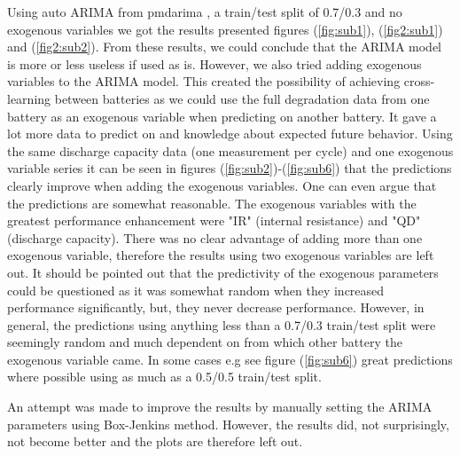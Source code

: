 \documentclass{article}
\begin{document}
Using auto ARIMA from pmdarima \cite{pmdarima}, a train/test split of 0.7/0.3 and no exogenous variables we got the results presented figures (\ref{fig:sub1}), (\ref{fig2:sub1}) and (\ref{fig2:sub2}). From these results, we could conclude that the ARIMA model is more or less useless if used as is. However, we also tried adding exogenous variables to the ARIMA model. This created the possibility of achieving cross-learning between batteries as we could use the full degradation data from one battery as an exogenous variable when predicting on another battery. It gave a lot more data to predict on and knowledge about expected future behavior. Using the same discharge capacity data (one measurement per cycle) and one exogenous variable series it can be seen in figures (\ref{fig:sub2})-(\ref{fig:sub6}) that the predictions clearly improve when adding the exogenous variables. One can even argue that the predictions are somewhat reasonable. The exogenous variables with the greatest performance enhancement were "IR" (internal resistance) and "QD" (discharge capacity). There was no clear advantage of adding more than one exogenous variable, therefore the results using two exogenous variables are left out. It should be pointed out that the predictivity of the exogenous parameters could be questioned as it was somewhat random when they increased performance significantly, but, they never decrease performance. However, in general, the predictions using anything less than a 0.7/0.3 train/test split were seemingly random and much dependent on from which other battery the exogenous variable came. In some cases e.g see figure (\ref{fig:sub6}) great predictions where possible using as much as a 0.5/0.5 train/test split.

An attempt was made to improve the results by manually setting the ARIMA parameters using Box-Jenkins method. However, the results did, not surprisingly, not become better and the plots are therefore left out.
\end{document}
